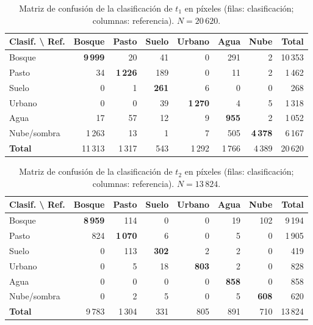 \documentclass[12pt]{article}
\begin{document}
\begin{table}[H]
    \centering
    \caption{Matriz de confusión de la clasificación de $t_1$ en píxeles (filas: clasificación; columnas: referencia). $N = 20\,620$.}
    \label{tab:cm_t1}
    \small
    \begin{tabular}{lrrrrrrr}
        \toprule
        \textbf{Clasif. \textbackslash{} Ref.} & \textbf{Bosque} & \textbf{Pasto} & \textbf{Suelo} & \textbf{Urbano} & \textbf{Agua} & \textbf{Nube} & \textbf{Total} \\
        \midrule
        Bosque & \textbf{9\,999} & 20 & 41 & 0 & 291 & 2 & 10\,353 \\
        Pasto  & 34 & \textbf{1\,226} & 189 & 0 & 11 & 2 & 1\,462 \\
        Suelo  & 0 & 1 & \textbf{261} & 6 & 0 & 0 & 268 \\
        Urbano & 0 & 0 & 39 & \textbf{1\,270} & 4 & 5 & 1\,318 \\
        Agua   & 17 & 57 & 12 & 9 & \textbf{955} & 2 & 1\,052 \\
        Nube/sombra & 1\,263 & 13 & 1 & 7 & 505 & \textbf{4\,378} & 6\,167 \\
        \midrule
        \textbf{Total} & 11\,313 & 1\,317 & 543 & 1\,292 & 1\,766 & 4\,389 & 20\,620 \\
        \bottomrule
    \end{tabular}
\end{table}

\begin{table}[H]
    \centering
    \caption{Matriz de confusión de la clasificación de $t_2$ en píxeles (filas: clasificación; columnas: referencia). $N = 13\,824$.}
    \label{tab:cm_t2}
    \small
    \begin{tabular}{lrrrrrrr}
        \toprule
        \textbf{Clasif. \textbackslash{} Ref.} & \textbf{Bosque} & \textbf{Pasto} & \textbf{Suelo} & \textbf{Urbano} & \textbf{Agua} & \textbf{Nube} & \textbf{Total} \\
        \midrule
        Bosque & \textbf{8\,959} & 114 & 0 & 0 & 19 & 102 & 9\,194 \\
        Pasto  & 824 & \textbf{1\,070} & 6 & 0 & 5 & 0 & 1\,905 \\
        Suelo  & 0 & 113 & \textbf{302} & 2 & 2 & 0 & 419 \\
        Urbano & 0 & 5 & 18 & \textbf{803} & 2 & 0 & 828 \\
        Agua   & 0 & 0 & 0 & 0 & \textbf{858} & 0 & 858 \\
        Nube/sombra & 0 & 2 & 5 & 0 & 5 & \textbf{608} & 620 \\
        \midrule
        \textbf{Total} & 9\,783 & 1\,304 & 331 & 805 & 891 & 710 & 13\,824 \\
        \bottomrule
    \end{tabular}
\end{table}
\end{document}
